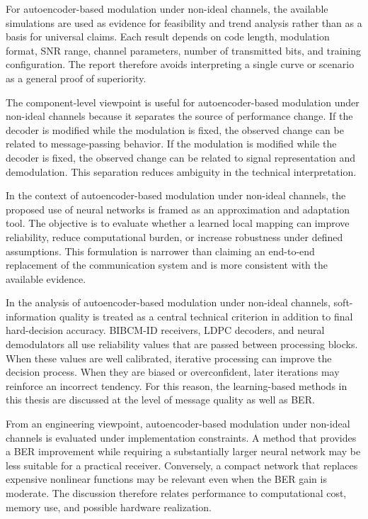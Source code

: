 For autoencoder-based modulation under non-ideal channels, the available simulations are used as evidence for feasibility and trend analysis rather than as a basis for universal claims. Each result depends on code length, modulation format, SNR range, channel parameters, number of transmitted bits, and training configuration. The report therefore avoids interpreting a single curve or scenario as a general proof of superiority.

The component-level viewpoint is useful for autoencoder-based modulation under non-ideal channels because it separates the source of performance change. If the decoder is modified while the modulation is fixed, the observed change can be related to message-passing behavior. If the modulation is modified while the decoder is fixed, the observed change can be related to signal representation and demodulation. This separation reduces ambiguity in the technical interpretation.

In the context of autoencoder-based modulation under non-ideal channels, the proposed use of neural networks is framed as an approximation and adaptation tool. The objective is to evaluate whether a learned local mapping can improve reliability, reduce computational burden, or increase robustness under defined assumptions. This formulation is narrower than claiming an end-to-end replacement of the communication system and is more consistent with the available evidence.

In the analysis of autoencoder-based modulation under non-ideal channels, soft-information quality is treated as a central technical criterion in addition to final hard-decision accuracy. BIBCM-ID receivers, LDPC decoders, and neural demodulators all use reliability values that are passed between processing blocks. When these values are well calibrated, iterative processing can improve the decision process. When they are biased or overconfident, later iterations may reinforce an incorrect tendency. For this reason, the learning-based methods in this thesis are discussed at the level of message quality as well as BER.

From an engineering viewpoint, autoencoder-based modulation under non-ideal channels is evaluated under implementation constraints. A method that provides a BER improvement while requiring a substantially larger neural network may be less suitable for a practical receiver. Conversely, a compact network that replaces expensive nonlinear functions may be relevant even when the BER gain is moderate. The discussion therefore relates performance to computational cost, memory use, and possible hardware realization.


